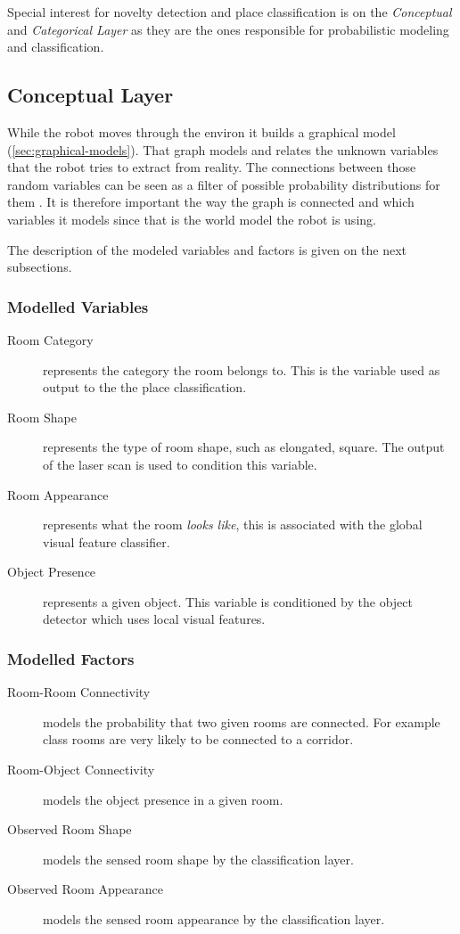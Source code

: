 Special interest for novelty detection and place classification is on the \emph{Conceptual} and \emph{Categorical Layer} as they are the ones responsible for probabilistic modeling and classification.


\subsection{Conceptual Layer}
While the robot moves through the environ it builds a graphical model (\autoref{sec:graphical-models}).
That graph models and relates the unknown variables that the robot tries to extract from reality.
The connections between those random variables can be seen as a filter of possible probability distributions for them \citep{bishop2006pattern}. It is therefore important the way the graph is connected and which variables it models since that is the world model the robot is using.

The description of the modeled variables and factors is given on the next subsections.
\subsubsection*{Modelled Variables}
\begin{description}
\item[Room Category] represents the category the room belongs to. This is the variable used as output to the the place classification.
\item[Room Shape] represents the type of room shape, such as elongated, square. The output of the laser scan is used to condition this variable.
\item[Room Appearance] represents what the room \emph{looks like}, this is associated with the global visual feature classifier.
\item[Object Presence] represents a given object. This variable is conditioned by the object detector which uses local visual features.
\end{description}

\subsubsection*{Modelled Factors}
\begin{description}
\item[Room-Room Connectivity] models the probability that two given rooms are connected. For example class rooms are very likely to be connected to a corridor.
\item[Room-Object Connectivity] models the object presence in a given room.
\item[Observed Room Shape] models the sensed room shape by the classification layer.
\item[Observed Room Appearance] models the sensed room appearance by the classification layer.
\end{description}


